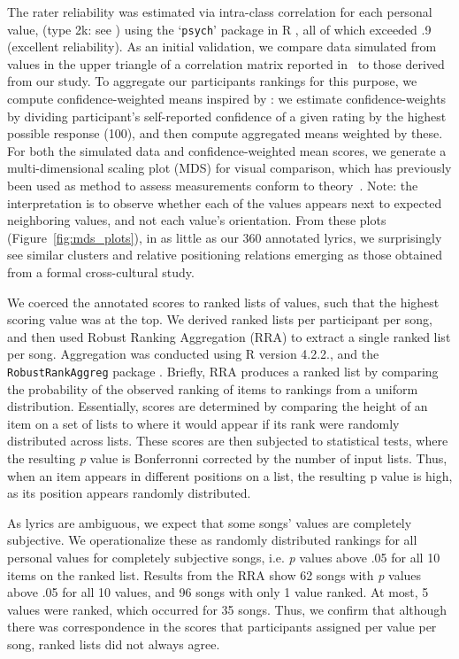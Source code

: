 \documentclass{article}
\begin{document}
The rater reliability was estimated via intra-class correlation for each personal value, (type 2k: see \cite{koo2016guideline}) using the `\texttt{psych}' package in R \cite{Psychcitation}, all of which exceeded .9 (excellent reliability). As an initial validation, we compare data simulated from values in the upper triangle of a correlation matrix reported in~\cite{schwartz2001extending} to those derived from our study. To aggregate our participants rankings for this purpose, we compute confidence-weighted means inspired by \cite{cabitza2020if}: we estimate confidence-weights by dividing participant’s self-reported confidence of a given rating by the highest possible response (100), and then compute aggregated means weighted by these. For both the simulated data and confidence-weighted mean scores, we generate a multi-dimensional scaling plot (MDS) \cite{davison2000multidimensional} for visual comparison, which has previously been used as method to assess measurements conform to theory~\cite{ponizovskiy2020development, lindeman2005measuring}. Note: the interpretation is to observe whether each of the values appears next to expected neighboring values, and not each value's orientation. From these plots (Figure~\ref{fig:mds_plots}), in as little as our 360 annotated lyrics, we surprisingly see similar clusters and relative positioning relations emerging as those obtained from a formal cross-cultural study. 

We coerced the annotated scores to ranked lists of values, such that the highest scoring value was at the top. We derived ranked lists per participant per song, and then used Robust Ranking Aggregation (RRA) to extract a single ranked list per song. Aggregation was conducted using R version 4.2.2.\cite{Rcitation}, and the \texttt{RobustRankAggreg} package \cite{RRAcitation}. Briefly, RRA produces a ranked list by comparing the probability of the observed ranking of items to rankings from a uniform distribution. Essentially, scores are determined by comparing the height of an item on a set of lists to where it would appear if its rank were randomly distributed across lists. These scores are then subjected to statistical tests, where the resulting \textit{p} value is Bonferronni corrected by the number of input lists\cite{kolde2012robust}. Thus, when an item appears in different positions on a list, the resulting p value is high, as its position appears randomly distributed. 

As lyrics are ambiguous, we expect that some songs' values are completely subjective. We operationalize these as randomly distributed rankings for all personal values for completely subjective songs, i.e. \textit{p} values above .05 for all 10 items on the ranked list. Results from the RRA show 62 songs with \textit{p} values above .05 for all 10 values, and 96 songs with only 1 value ranked. At most, 5 values were ranked, which occurred for 35 songs. Thus, we confirm that although there was correspondence in the scores that participants assigned per value per song, ranked lists did not always agree. 
\end{document}
